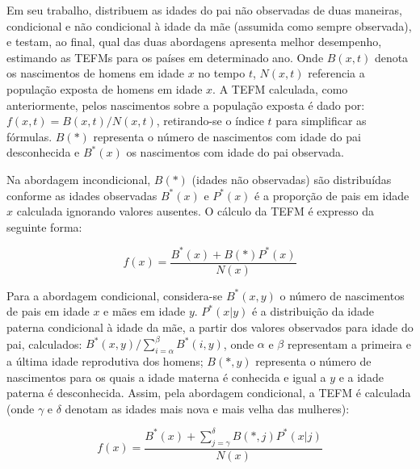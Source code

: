 Em seu trabalho,  distribuem as idades do pai não observadas de duas maneiras, condicional e não condicional à idade da mãe (assumida como sempre observada), e testam, ao final, qual das duas abordagens apresenta melhor desempenho, estimando as TEFMs para os países em determinado ano. Onde $B(x,t)$ denota os nascimentos de homens em idade $x$ no tempo $t$, $N(x,t)$ referencia a população exposta de homens em idade $x$. A TEFM calculada, como anteriormente, pelos nascimentos sobre a população exposta é dado por: $f(x,t)=B(x,t)/N(x,t)$, retirando-se o índice $t$ para simplificar as fórmulas. $B(\ast)$ representa o número de nascimentos com idade do pai desconhecida e $B^*(x)$ os nascimentos com idade do pai observada. 


Na abordagem incondicional, $B(\ast)$ (idades não observadas) são distribuídas conforme as idades observadas $B^*(x)$ e $P^*(x)$ é a proporção de pais em idade $x$ calculada ignorando valores ausentes. O cálculo da TEFM é expresso da seguinte forma: 

\begin{equation}
    f(x)=\frac{B^*(x)+B(\ast)P^*(x)}{N(x)}
\end{equation}

Para a abordagem condicional, considera-se $B^*(x,y)$ o número de nascimentos de pais em idade $x$ e mães em idade $y$. $P^*(x|y)$ é a distribuição da idade paterna condicional à idade da mãe, a partir dos valores observados para idade do pai, calculados: $B^*(x,y)/ \sum_{i=\alpha}^{\beta}B^*(i,y)$, onde $\alpha$ e $\beta$ representam a primeira e a última idade reprodutiva dos homens; $B(\ast,y)$ representa o número de nascimentos para os quais a idade materna é conhecida e igual a $y$ e a idade paterna é desconhecida. Assim, pela abordagem condicional, a TEFM é calculada (onde $\gamma$ e $\delta$ denotam as idades mais nova e mais velha das mulheres): 

\begin{equation}
    f(x)=\frac{B^*(x)+\sum_{j= \gamma}^{\delta}  B(\ast, j)P^*(x|j)}{N(x)}
\end{equation}





\begin{comment}

(fazer uma tabela mostrando os métodos já propostos e as bases utilizadas, seus pós e contra --\textit{shoumaker})


problema do método de estimar pelos filhos que coabitam residencia com os pais: 
mudanças no padrão de casamento, multiparentalidade--- >

https://journals.library.ualberta.ca/csp/index.php/csp/article/view/15837/12642
.....

FECHAR FALANDO SOBRE O PORQUE ESCOLHER A METODOLOGIA QUE ESCOLHI PARA TRATAR O DADO... 

\end{comment}




